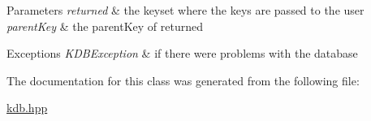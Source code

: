 \begin{DoxyParams}{Parameters}
{\em returned} & the keyset where the keys are passed to the user \\
\hline
{\em parent\+Key} & the parent\+Key of returned\\
\hline
\end{DoxyParams}

\begin{DoxyExceptions}{Exceptions}
{\em K\+D\+B\+Exception} & if there were problems with the database \\
\hline
\end{DoxyExceptions}


The documentation for this class was generated from the following file\+:\begin{DoxyCompactItemize}
\item 
\mbox{\hyperlink{kdb_8hpp}{kdb.\+hpp}}\end{DoxyCompactItemize}
